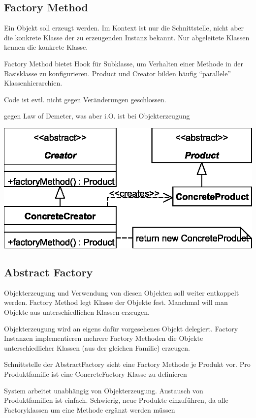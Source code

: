 \documentclass[a4paper,fontsize=9pt, DIV=calc]{scrartcl}
\begin{document}
\begin{multicols}{2}
\begin{minipage}{0.6\columnwidth}
\end{minipage}

\subsection{Factory Method}
\begin{description}[leftmargin=*]\itemsep-2mm
\item[Problem] Ein Objekt soll erzeugt werden. Im Kontext ist nur die Schnittstelle, nicht aber die konkrete Klasse der zu erzeugenden Instanz bekannt. Nur abgeleitete Klassen kennen die konkrete Klasse.
\item[Konsequenzen] Factory Method bietet Hook für Subklasse, um Verhalten einer Methode in der Basisklasse zu konfigurieren. Product und Creator bilden häufig "`parallele"' Klassenhierarchien.
\item[Kritik an new] Code ist evtl. nicht gegen Veränderungen geschlossen.
\item[Verstößt] gegen Law of Demeter, was aber i.O. ist bei Objekterzeugung
\end{description}

\begin{center}
\includegraphics[width=0.85\columnwidth]{src/factory}
\end{center}

\subsection{Abstract Factory}
\begin{description}[leftmargin=*]\itemsep-2mm
\item[Problem] Objekterzeugung und Verwendung von diesen Objekten soll weiter entkoppelt werden. Factory Method legt Klasse der Objekte fest. Manchmal will man Objekte aus unterschiedlichen Klassen erzeugen.
\item[Lösung] Objekterzeugung wird an eigens dafür vorgesehenes Objekt delegiert. Factory Instanzen implementieren mehrere Factory Methoden die Objekte unterschiedlicher Klassen (aus der gleichen Familie) erzeugen.
\item[Realisierung] Schnittstelle der AbstractFactory sieht eine Factory Methode je Produkt vor. Pro Produktfamilie ist eine ConcreteFactory Klasse zu definieren
\item[Konsequenzen] System arbeitet unabhängig von Objekterzeugung. Austausch von Produktfamilien ist einfach. Schwierig, neue Produkte einzuführen, da alle Factoryklassen um eine Methode ergänzt werden müssen
\end{description}


\end{multicols}
\end{document}
